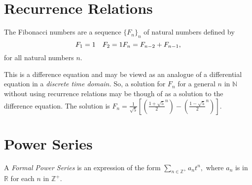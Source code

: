 \section{Recurrence Relations}
\begin{example}
	The Fibonacci numbers are a sequence $\{ F_n \}_n$ of natural numbers defined by
	$$ F_1 = 1 \quad F_2 = 1 \\
	F_n = F_{n-2} + F_{n-1},$$
	for all natural numbers $n.$
\end{example}
This is a difference equation and may be viewd as an analogue of a differential
equation in a \emph{discrete time domain.}
So, a solution for $F_n$ for a general $n$ in $\mathbb{N}$ without
using recurrence relations may be though of as a solution to the difference equation.
The solution is $F_n = \frac{1}{\sqrt{5}} \left[ \left( 
\frac{1 + \sqrt{5}}{2}^n \right)  - \left( \frac{1 - \sqrt{5}}{2}^n \right) \right].$

\section{Power Series}
A \emph{Formal Power Series} is an expression of the form $ \sum_{n \in \mathbb{Z}^+}^{} 
a_n t^n,$ where $a_n$ is in $\mathbb{R}$ for each $n$ in $\mathbb{Z}^+.$
